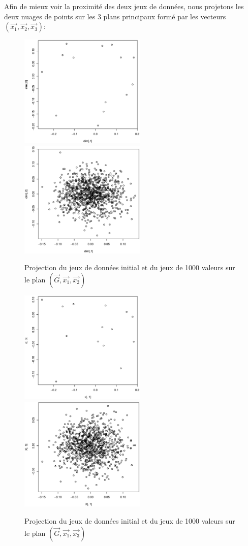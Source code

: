 \documentclass[a4paper]{article}
\begin{document}
Afin de mieux voir la proximité des deux jeux de données, nous projetons les deux nuages de points sur les 3 plans principaux formé par les vecteurs $(\vec{x_ {1}},\vec{x_{2}},\vec{x_{3}})$:
\begin{figure}[H]
\includegraphics[width=6cm]{proj12data.eps}\hfill
\includegraphics[width=6cm]{proj12gener.eps}
\caption{Projection du jeux de données initial et du jeux de 1000 valeurs sur le plan $(\vec{G},\vec{x_{1}},\vec{x_{2}})$}\label{fig:somefiglabel}
\end{figure}

\begin{figure}[H]
\includegraphics[width=6cm]{proj13data.eps}\hfill
\includegraphics[width=6cm]{proj13gener.eps}
\caption{Projection du jeux de données initial et du jeux de 1000 valeurs sur le plan $(\vec{G},\vec{x_{1}},\vec{x_{3}})$}\label{fig:somefiglabel}
\end{figure}
\end{document}
